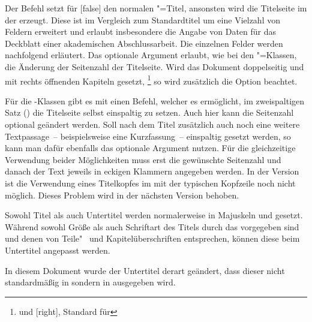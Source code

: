 \documentclass[%
  english,ngerman,%
  headings=optiontoheadandtoc,captions=tableheading,numbers=noenddot,%
  chapterpage,cdfoot,%
]{tudscrman}
\begin{document}
\begin{Declaration}{}
\begin{Declaration}{%
}
\printdeclarationlist%
%
%
%
%
Der Befehl  setzt für [false] den normalen 
\KOMAScript"=Titel{}, ansonsten wird die Titelseite im \CD der \TnUD 
erzeugt. Diese ist im Vergleich zum Standardtitel um eine Vielzahl von 
Feldern erweitert und erlaubt insbesondere die Angabe von Daten für das 
Deckblatt einer akademischen Abschlussarbeit. Die einzelnen Felder werden 
nachfolgend erläutert. Das optionale Argument erlaubt, wie bei den 
\KOMAScript"=Klassen, die Änderung der Seitenzahl der Titelseite. Wird das 
Dokument doppelseitig und mit rechts öffnenden Kapiteln gesetzt,%
\footnote{%
   und [right], Standard für 
}
so wird zusätzlich die Option  beachtet.

Für die \TUDScript-Klassen gibt es mit  einen Befehl, 
welcher es ermöglicht, im zweispaltigen Satz () die 
Titelseite selbst einspaltig zu setzen. Auch hier kann die Seitenzahl optional 
geändert werden. Soll nach dem Titel zusätzlich auch noch eine weitere 
Textpassage~-- beispielsweise eine Kurzfassung~-- einspaltig gesetzt werden, 
so kann man dafür ebenfalls das optionale Argument nutzen. Für die 
gleichzeitige Verwendung beider Möglichkeiten muss erst die gewünschte 
Seitenzahl und danach der Text jeweils in eckigen Klammern angegeben werden.
\Attention In der Version~\vTUDScript{} ist die Verwendung eines Titelkopfes im 
\CD mit der typischen Kopfzeile noch nicht möglich. Dieses Problem wird in der 
nächsten Version behoben.
\end{Declaration}
\end{Declaration}

\begin{Declaration}{}
\begin{Declaration}{}
\printdeclarationlist%
%
%
Sowohl Titel als auch Untertitel werden normalerweise in Majuskeln und 
\DIN gesetzt. Während sowohl Größe als auch Schriftart des Titels durch das \CD 
vorgegeben sind und denen von Teile"~ und Kapitelüberschriften entsprechen, 
können diese beim Untertitel angepasst werden.
%
\begin{Example}
In diesem Dokument wurde der Untertitel derart geändert, dass dieser nicht 
standardmäßig in \DIN sondern in  ausgegeben wird.
\begin{code}[escapechar=§]
\subtitle{§§}
\end{code}
\end{Example}
\end{Declaration}
\end{Declaration}
\end{document}
